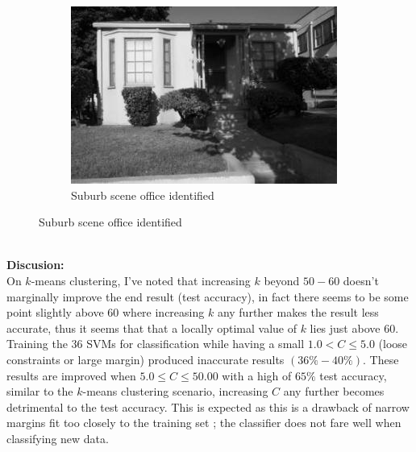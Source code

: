 \begin{homeworkProblem}
\begin{figure}[H]
\begin{subfigure}{0.5\textwidth}
    \centering
    \caption{Suburb scene office identified}
    \includegraphics[width=.5\linewidth]{./images/7_surb.jpg}
  \end{subfigure}
\end{figure}

\\
\textbf{Discusion:}
\\
On $k$-means clustering, I've noted that increasing $k$ beyond $50-60$ doesn't marginally improve the
end result (test accuracy), in fact there seems to be some point slightly above $60$ where
increasing $k$ any further makes the result less accurate, thus it seems that
that a locally optimal value of $k$ lies just above $60$. Training the $36$ SVMs
for classification while having a small $ 1.0 < C \leq 5.0 $  (loose constraints
or large margin) produced inaccurate results $(36\% - 40\%)$. These results are improved when $5.0 \leq C \leq 50.00$ with
a high of $65 \%$ test accuracy, similar to the $k$-means clustering scenario,
increasing $C$ any further becomes detrimental to the test accuracy. This is
expected as this is a drawback of narrow margins fit too closely to the
training set ; the classifier does not fare well when classifying new data.

\end{homeworkProblem}


